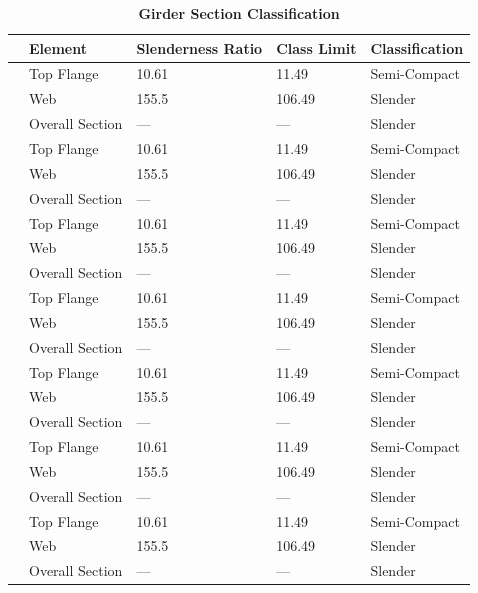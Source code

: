 \documentclass[12pt,a4paper]{report}
\numberwithin{table}{chapter}
\numberwithin{figure}{chapter}
\begin{document}
\vspace{1em}
\begin{longtable}{|C{2.5cm}|L{3cm}|C{3.5cm}|C{2.5cm}|>{\centering\arraybackslash}p{4.0cm}|}
\caption{\textbf{Girder Section Classification}}
\hline
\textbf{} & \textbf{Element} & \textbf{Slenderness Ratio} & \textbf{Class Limit} & \textbf{Classification} \\[6pt]
\hline
{} & Top Flange & 10.61 & 11.49 & Semi-Compact \\[6pt]
 & Web & 155.5 & 106.49 & Slender \\[6pt]
 & Overall Section & --- & --- & Slender \\[6pt]
\hline
{} & Top Flange & 10.61 & 11.49 & Semi-Compact \\[6pt]
 & Web & 155.5 & 106.49 & Slender \\[6pt]
 & Overall Section & --- & --- & Slender \\[6pt]
\hline
{} & Top Flange & 10.61 & 11.49 & Semi-Compact \\[6pt]
 & Web & 155.5 & 106.49 & Slender \\[6pt]
 & Overall Section & --- & --- & Slender \\[6pt]
\hline
{} & Top Flange & 10.61 & 11.49 & Semi-Compact \\[6pt]
 & Web & 155.5 & 106.49 & Slender \\[6pt]
 & Overall Section & --- & --- & Slender \\[6pt]
\hline
{} & Top Flange & 10.61 & 11.49 & Semi-Compact \\[6pt]
 & Web & 155.5 & 106.49 & Slender \\[6pt]
 & Overall Section & --- & --- & Slender \\[6pt]
\hline
{} & Top Flange & 10.61 & 11.49 & Semi-Compact \\[6pt]
 & Web & 155.5 & 106.49 & Slender \\[6pt]
 & Overall Section & --- & --- & Slender \\[6pt]
\hline
{} & Top Flange & 10.61 & 11.49 & Semi-Compact \\[6pt]
 & Web & 155.5 & 106.49 & Slender \\[6pt]
 & Overall Section & --- & --- & Slender \\[6pt]

\end{longtable}
\end{document}
